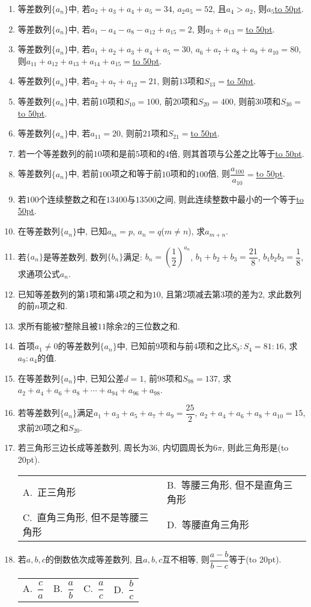 \documentclass[10pt,a4paper]{article}
\newcommand{\blank}[1]{\underline{\hbox to #1pt{}}}
\newcommand{\bracket}[1]{(\hbox to #1pt{})}
\newcommand{\twoch}[4]{\par\begin{tabular}{p{.46\textwidth}p{.46\textwidth}}
A.~#1& B.~#2\\
C.~#3& D.~#4
\end{tabular}}
\newcommand{\fourch}[4]{\par\begin{tabular}{p{.23\textwidth}p{.23\textwidth}p{.23\textwidth}p{.23\textwidth}}
A.~#1 &B.~#2& C.~#3& D.~#4
\end{tabular}}
\begin{document}
\begin{enumerate}[1.]
\item 等差数列$\{a_n\}$中, 若$a_2+a_3+a_4+a_5=34$, $a_2a_5=52$, 且$a_4>a_2$, 则$a_5$\blank{50}.
\item 等差数列$\{a_n\}$中, 若$a_1-a_4-a_8-a_{12}+a_{15}=2$, 则$a_3+a_{13}=$\blank{50}.
\item 等差数列$\{a_n\}$中, 若$a_1+a_2+a_3+a_4+a_5=30$, $a_6+a_7+a_8+a_9+a_{10}=80$, 则$a_{11}+a_{12}+a_{13}+a_{14}+a_{15}=$\blank{50}.
\item 等差数列$\{a_n\}$中, 若$a_2+a_7+a_{12}=21$, 则前$13$项和$S_{13}=$\blank{50}.
\item 等差数列$\{a_n\}$中, 若前$10$项和$S_{10}=100$, 前$20$项和$S_{20}=400$, 则前$30$项和$S_{30}=$\blank{50}.
\item 等差数列$\{a_n\}$中, 若$a_{11}=20$, 则前$21$项和$S_{21}=$\blank{50}.
\item 若一个等差数列的前$10$项和是前$5$项和的$4$倍, 则其首项与公差之比等于\blank{50}.
\item 等差数列$\{a_n\}$中, 若前$100$项之和等于前$10$项和的$100$倍, 则$\dfrac{a_{100}}{a_{10}}=$\blank{50}.
\item 若$100$个连续整数之和在$13400$与$13500$之间, 则此连续整数中最小的一个等于\blank{50}.
\item 在等差数列$\{a_n\}$中, 已知$a_m=p$, $a_n=q$($m\ne n$), 求$a_{m+n}$.
\item 若$\{a_n\}$是等差数列, 数列$\{b_n\}$满足: $b_n=(\dfrac 12)^{a_n}$, $b_1+b_2+b_3=\dfrac{21}8$, $b_1b_2b_3=\dfrac 18$, 求通项公式$a_n$.
\item 已知等差数列的第$1$项和第$4$项之和为$10$, 且第$2$项减去第$3$项的差为$2$, 求此数列的前$n$项之和.
\item 求所有能被$7$整除且被$11$除余$2$的三位数之和.
\item 首项$a_1\ne 0$的等差数列$\{a_n\}$中, 已知前$9$项和与前$4$项和之比$S_9:S_4=81:16$, 求$a_9:a_4$的值.
\item 在等差数列$\{a_n\}$中, 已知公差$d=1$, 前$98$项和$S_{98}=137$, 求$a_2+a_4+a_6+a_8+\cdots +a_{94}+a_{96}+a_{98}$.
\item 若等差数列$\{a_n\}$满足$a_1+a_3+a_5+a_7+a_9=\dfrac{25}2$, $a_2+a_4+a_6+a_8+a_{10}=15$, 求前$20$项之和$S_{20}$.
\item 若三角形三边长成等差数列, 周长为$36$, 内切圆周长为$6\pi$, 则此三角形是\bracket{20}.
\twoch{正三角形}{等腰三角形, 但不是直角三角形}{直角三角形, 但不是等腰三角形}{等腰直角三角形}
\item 若$a,b,c$的倒数依次成等差数列, 且$a,b,c$互不相等, 则$\dfrac{a-b}{b-c}$等于\bracket{20}.
\fourch{$\dfrac ca$}{$\dfrac ab$}{$\dfrac ac$}{$\dfrac bc$}

\end{enumerate}
\end{document}
